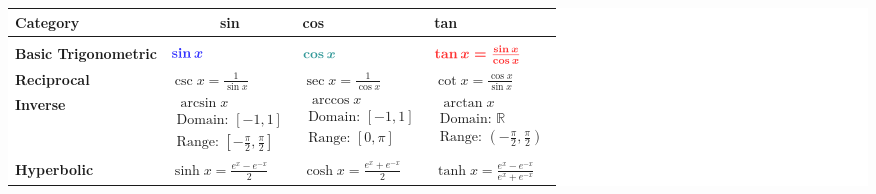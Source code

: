 \documentclass{article}
\begin{document}
\begin{center}
\colorbox{white}{\begin{tabular}{|l|l|l|l|}
\hline

\rowcolor{blue!20}
\rule{0pt}{4ex}
    \cellcolor{blue!30}
    \textbf{Category} & 
    \multicolumn{1}{c|}{\textbf{sin}} & 
    \cellcolor{blue!30}
    \textbf{cos} & 
    \textbf{tan}
    \rule[-1ex]{0pt}{0pt} \\
\hline

\rowcolor{blue!10}
\multicolumn{4}{|c|}{
    \rule{0pt}{4ex}
    \textbf{Basic}} \\
\hline

    \rule{0pt}{4ex}\textbf{Basic Trigonometric} & 
        $\boldsymbol{\textcolor{blue!80}{
            \sin x}}$ & 
        $\boldsymbol{\textcolor{teal!80}{
            \cos x}}$ & 
        $\boldsymbol{\textcolor{red!80}{
            \tan x = \frac{\sin x}{\cos x}}}$
        \rule[-1ex]{0pt}{0pt} \\
    \hline

    \rule{0pt}{4ex}\textbf{Reciprocal} & 
        $\csc x = \frac{1}{\sin x}$ & 
        $\sec x = \frac{1}{\cos x}$ & 
        $\cot x = \frac{\cos x}{\sin x}$
        \rule[-1ex]{0pt}{0pt} \\
    \hline

    \rule{0pt}{4ex}\textbf{Inverse} & 
        $\begin{array}{c}
            \arcsin x \\
            \text{Domain: } [-1,1] \\
            \text{Range: } [-\frac{\pi}{2}, \frac{\pi}{2}]
        \end{array}$ & 
        $\begin{array}{c}
            \arccos x \\
            \text{Domain: } [-1,1] \\
            \text{Range: } [0, \pi]
        \end{array}$ & 
        $\begin{array}{c}
            \arctan x \\
            \text{Domain: } \mathbb{R} \\
            \text{Range: } (-\frac{\pi}{2}, \frac{\pi}{2})
        \end{array}$
        \rule[-1ex]{0pt}{0pt} \\
    \hline

    \rule{0pt}{4ex}\textbf{Hyperbolic} & 
        $\sinh x = \frac{e^x - e^{-x}}{2}$ & 
        $\cosh x = \frac{e^x + e^{-x}}{2}$ & 
        $\tanh x = \frac{e^x - e^{-x}}{e^x + e^{-x}}$
        \rule[-1ex]{0pt}{0pt} \\
    \hline


\end{tabular}}
\end{center}
\end{document}
